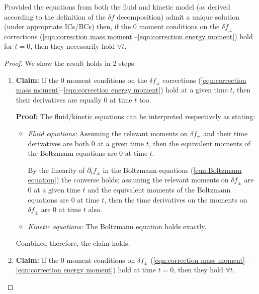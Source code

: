     \begin{conjecture}\label{con:delta f correction moments}
        Provided the equations from both the fluid and kinetic model (as derived according to the definition of the $\delta\!f$ decomposition) admit a unique solution (under appropriate ICs/BCs) then, if the 0 moment conditions on the $\delta\!f_{\pm}$ corrections (\ref{eqn:correction mass moment}--\ref{eqn:correction energy moment}) hold for $t  =  0$, then they necessarily hold $\forall t$.
    \end{conjecture}
    \begin{proof}
        We show the result holds in 2 steps:
        \begin{enumerate}
            \item  {\bf Claim:} If the 0 moment conditions on the $\delta\!f_{\pm}$ corrections (\ref{eqn:correction mass moment}--\ref{eqn:correction energy moment}) hold at a given time $t$, then their derivatives are equally 0 at time $t$ too.
            
            {\bf Proof:} The fluid/kinetic equations can be interpreted respectively as stating:
            \begin{itemize}
                \item  \emph{Fluid equations:} Assuming the relevant moments on $\delta\!f_{\pm}$ and their time derivatives are both 0 at a given time $t$, then the equivalent moments of the Boltzmann equations are 0 at time $t$.

                By the linearity of $\partial_{t}f_{\pm}$ in the Boltzmann equations (\ref{eqn:Boltzmann equation}) the converse holds; assuming the relevant moments on $\delta\!f_{\pm}$ are 0 at a given time $t$ and the equivalent moments of the Boltzmann equations are 0 at time $t$, then the time derivatives on the moments on $\delta\!f_{\pm}$ are 0 at time $t$ also.
                
                \item  \emph{Kinetic equations:} The Boltzmann equation holds exactly.
            \end{itemize}
            Combined therefore, the claim holds.

            \item  {\bf Claim:} If the 0 moment conditions on $\delta\!f_{\pm}$ (\ref{eqn:correction mass moment}--\ref{eqn:correction energy moment}) hold at time $t  =  0$, then they hold $\forall t$.
            

\end{enumerate}
\end{proof}
